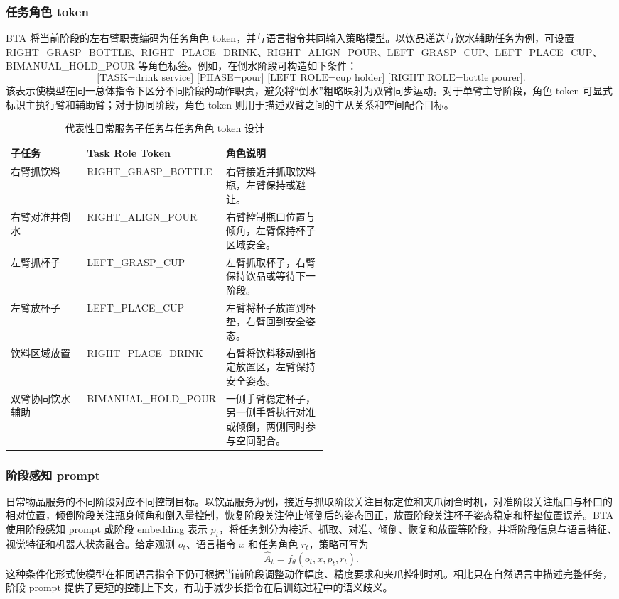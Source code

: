\documentclass[UTF8,a4paper,zihao=5,scheme=chinese]{ctexart}
\numberwithin{figure}{section}
\numberwithin{table}{section}
\begin{document}
\subsubsection{任务角色 token}

BTA 将当前阶段的左右臂职责编码为任务角色 token，并与语言指令共同输入策略模型。以饮品递送与饮水辅助任务为例，可设置 RIGHT\_GRASP\_BOTTLE、RIGHT\_PLACE\_DRINK、RIGHT\_ALIGN\_POUR、LEFT\_GRASP\_CUP、LEFT\_PLACE\_CUP、BIMANUAL\_HOLD\_POUR 等角色标签。例如，在倒水阶段可构造如下条件：
\[
\text{[TASK=drink\_service] [PHASE=pour] [LEFT\_ROLE=cup\_holder] [RIGHT\_ROLE=bottle\_pourer]}.
\]
该表示使模型在同一总体指令下区分不同阶段的动作职责，避免将“倒水”粗略映射为双臂同步运动。对于单臂主导阶段，角色 token 可显式标识主执行臂和辅助臂；对于协同阶段，角色 token 则用于描述双臂之间的主从关系和空间配合目标。

\begin{table}[htbp]
  \centering
  \caption{代表性日常服务子任务与任务角色 token 设计}
  \label{tab:role_token}
  \begin{tabularx}{\linewidth}{p{0.24\linewidth}p{0.28\linewidth}X}
    \toprule
    子任务 & Task Role Token & 角色说明 \\
    \midrule
    右臂抓饮料 & RIGHT\_GRASP\_BOTTLE & 右臂接近并抓取饮料瓶，左臂保持或避让。 \\
    右臂对准并倒水 & RIGHT\_ALIGN\_POUR & 右臂控制瓶口位置与倾角，左臂保持杯子区域安全。 \\
    左臂抓杯子 & LEFT\_GRASP\_CUP & 左臂抓取杯子，右臂保持饮品或等待下一阶段。 \\
    左臂放杯子 & LEFT\_PLACE\_CUP & 左臂将杯子放置到杯垫，右臂回到安全姿态。 \\
    饮料区域放置 & RIGHT\_PLACE\_DRINK & 右臂将饮料移动到指定放置区，左臂保持安全姿态。 \\
    双臂协同饮水辅助 & BIMANUAL\_HOLD\_POUR & 一侧手臂稳定杯子，另一侧手臂执行对准或倾倒，两侧同时参与空间配合。 \\
    \bottomrule
  \end{tabularx}
\end{table}

\subsubsection{阶段感知 prompt}

日常物品服务的不同阶段对应不同控制目标。以饮品服务为例，接近与抓取阶段关注目标定位和夹爪闭合时机，对准阶段关注瓶口与杯口的相对位置，倾倒阶段关注瓶身倾角和倒入量控制，恢复阶段关注停止倾倒后的姿态回正，放置阶段关注杯子姿态稳定和杯垫位置误差。BTA 使用阶段感知 prompt 或阶段 embedding 表示 $p_t$，将任务划分为接近、抓取、对准、倾倒、恢复和放置等阶段，并将阶段信息与语言特征、视觉特征和机器人状态融合。给定观测 $o_t$、语言指令 $x$ 和任务角色 $r_t$，策略可写为
\[
\hat A_t=f_{\theta}(o_t,x,p_t,r_t).
\]
这种条件化形式使模型在相同语言指令下仍可根据当前阶段调整动作幅度、精度要求和夹爪控制时机。相比只在自然语言中描述完整任务，阶段 prompt 提供了更短的控制上下文，有助于减少长指令在后训练过程中的语义歧义。
\end{document}
